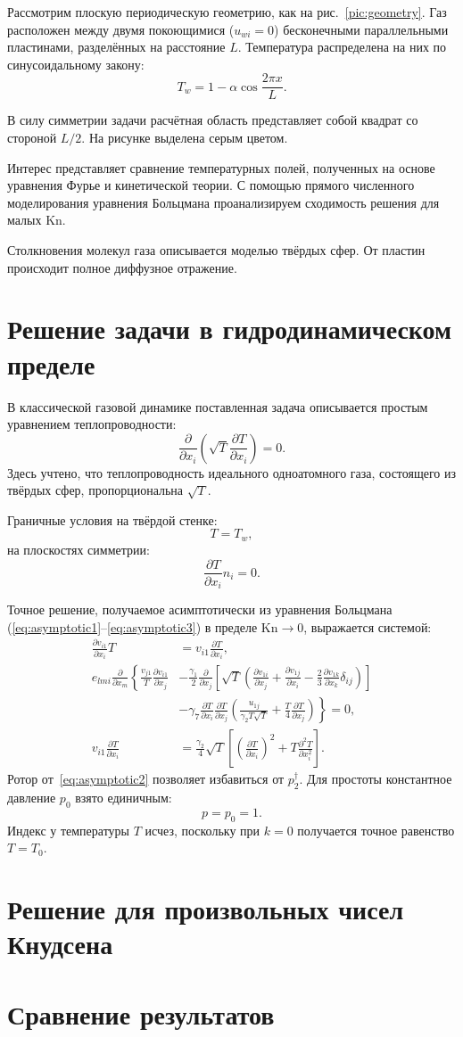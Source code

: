 \documentclass[english,russian,a4paper,12pt]{article}
\newcommand{\Kn}{\mathrm{Kn}}
\newcommand{\pder}[2][]{\frac{\partial#1}{\partial#2}}
\newcommand{\pderder}[2][]{\frac{\partial^2 #1}{\partial #2^2}}
\begin{document}
Рассмотрим плоскую периодическую геометрию, как на рис.~\ref{pic:geometry}.
Газ расположен между двумя покоющимися (\(u_{wi} = 0\)) бесконечными параллельными пластинами,
разделённых на расстояние \(L\). Температура распределена на них по синусоидальному закону:
\begin{equation}
	T_w = 1-\alpha\cos{\frac{2\pi x}L}.
\end{equation}

В силу симметрии задачи расчётная область представляет собой квадрат со стороной \(L/2\).
На рисунке выделена серым цветом.

Интерес представляет сравнение температурных полей, полученных на основе уравнения Фурье и кинетической теории.
С помощью прямого численного моделирования уравнения Больцмана проанализируем сходимость решения для малых \(\Kn\).

Столкновения молекул газа описывается моделью твёрдых сфер. От пластин происходит полное диффузное отражение. 

\section{Решение задачи в гидродинамическом пределе}

В классической газовой динамике поставленная задача описывается простым уравнением теплопроводности:
\begin{equation}\label{eq:classic_solution}
	\pder{x_i}\left(\sqrt{T}\pder[T]{x_i}\right) = 0.
\end{equation}
Здесь учтено, что теплопроводность идеального одноатомного газа, состоящего из твёрдых сфер,
пропорциональна \(\sqrt{T}\).
 
Граничные условия на твёрдой стенке:
\[ T = T_w, \]
на плоскостях симметрии:
\[ \pder[T]{x_i}n_i = 0. \]

Точное решение, получаемое асимптотически из уравнения Больцмана (\eqref{eq:asymptotic1}--\eqref{eq:asymptotic3})
в пределе \(\Kn \to 0\), выражается системой:
\begin{align*}
        \pder[v_{i1}]{x_i}T &= v_{i1}\pder[T]{x_i}, \\
        e_{lmi}\pder{x_m}\left\{
		\frac{v_{j1}}{T}\pder[v_{i1}]{x_j}
		\right.&- \frac{\gamma_1}2\pder{x_j}\left[\sqrt{T}\left(\pder[v_{1i}]{x_j}+\pder[v_{1j}]{x_i}-\frac23\pder[v_{1k}]{x_k}\delta_{ij}\right)\right] \\
		&-\left. \gamma_7\pder[T]{x_i}\pder[T]{x_j}\left(\frac{u_{1j}}{\gamma_2T\sqrt{T}} + \frac{T}4\pder[T]{x_j} \right)
	\right\} = 0, \\
        v_{i1}\pder[T]{x_i} &= \frac{\gamma_2}4\sqrt{T}\left[\left(\pder[T]{x_i}\right)^2 + T\pderder[T]{x_i}\right].
\end{align*}
Ротор от~\eqref{eq:asymptotic2} позволяет избавиться от \(p_2^\dag\).
Для простоты константное давление \(p_0\) взято единичным:
\[ p = p_0 = 1. \]
Индекс у температуры \(T\) исчез, поскольку при \(k=0\) получается точное равенство \(T=T_0\).

\section{Решение для произвольных чисел Кнудсена}

\section{Сравнение результатов}
\end{document}
